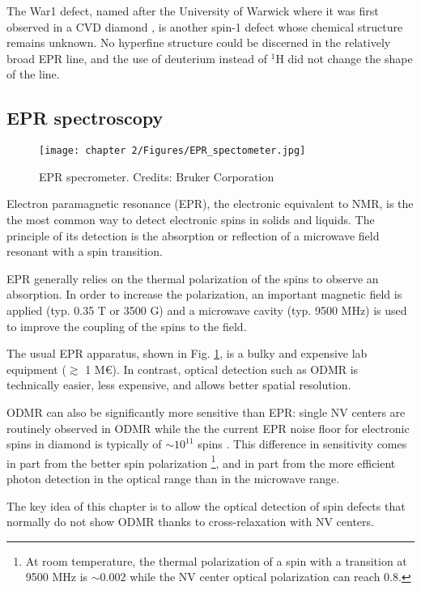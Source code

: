 \documentclass[a4paper, 11pt]{report}
\begin{document}
The War1 defect, named after the University of Warwick where it was first observed in a CVD diamond \citep{cruddace2007magnetic}, is another spin-1 defect whose chemical structure remains unknown. No hyperfine structure could be discerned in the relatively broad EPR line, and the use of deuterium instead of $^1$H did not change the shape of the line.

\subsection{EPR spectroscopy}
\begin{figure}[h!]
\centering
\texttt{[image: chapter 2/Figures/EPR\_spectometer.jpg]}
\caption{EPR specrometer. Credits: Bruker Corporation} 
\label{photo EPR}
\end{figure}

Electron paramagnetic resonance (EPR), the electronic equivalent to NMR, is the the most common way to detect electronic spins in solids and liquids. The principle of its detection is the absorption or reflection of a microwave field resonant with a spin transition.

EPR generally relies on the thermal polarization of the spins to observe an absorption. In order to increase the polarization, an important magnetic field is applied (typ. 0.35 T or 3500 G) and a microwave cavity (typ. 9500 MHz) is used to improve the coupling of the spins to the field.

The usual EPR apparatus, shown in Fig. \ref{photo EPR}, is a bulky and expensive lab equipment ($\gtrsim$ 1 M€). In contrast, optical detection such as ODMR is technically easier, less expensive, and allows better spatial resolution. 

ODMR can also be significantly more sensitive than EPR: single NV centers are routinely observed in ODMR while the the current EPR noise floor for electronic spins in diamond is typically of $\sim 10^{11}$ spins \citep{mitchell2013x}. This difference in sensitivity comes in part from the better spin polarization \footnote{At room temperature, the thermal polarization of a spin with a transition at 9500 MHz is $\sim 0.002$ while the NV center optical polarization can reach 0.8.}, and in part from the more efficient photon detection in the optical range than in the microwave range.

The key idea of this chapter is to allow the optical detection of spin defects that normally do not show ODMR thanks to cross-relaxation with NV centers.
\end{document}
